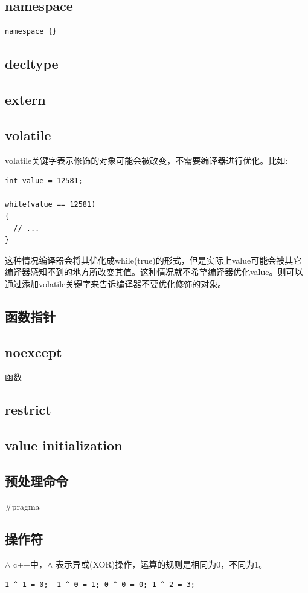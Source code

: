 \documentclass[12pt]{book}
\begin{document}
\subsection{namespace}
\begin{lstlisting}
namespace {}
\end{lstlisting}

\subsection{decltype}
\subsection{extern}
\subsection{volatile}
volatile关键字表示修饰的对象可能会被改变，不需要编译器进行优化。比如:
\begin{lstlisting}
int value = 12581;

while(value == 12581)
{
  // ...
}
\end{lstlisting}
这种情况编译器会将其优化成while(true)的形式，但是实际上value可能会被其它编译器感知不到的地方所改变其值。这种情况就不希望编译器优化value。则可以通过添加volatile关键字来告诉编译器不要优化修饰的对象。

\subsection{函数指针}
\subsection{noexcept}
函数
\subsection{restrict}
\subsection{value initialization}
\subsection{预处理命令}
\#pragma

\subsection{操作符}
$\land$ \newline
c++中，$\land$ 表示异或(XOR)操作，运算的规则是相同为0，不同为1。
\begin{lstlisting}
1 ^ 1 = 0;  1 ^ 0 = 1; 0 ^ 0 = 0; 1 ^ 2 = 3;
\end{lstlisting}
\end{document}
